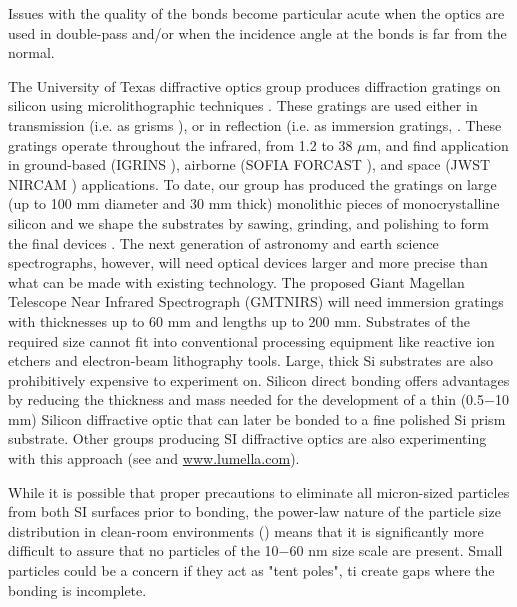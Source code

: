 \documentclass[osajnl,preprint,showpacs,superscriptaddress,12pt]{revtex4-1} %
\begin{document}
Issues with the quality of the bonds become particular acute when the optics are used in double-pass and/or when the incidence angle at the bonds is far from the normal.


The University of Texas diffractive optics group produces diffraction gratings on silicon using microlithographic techniques \cite{1998SPIE.3354..201J,2010SPIE.7739E.146W}.  These gratings are used either in transmission (i.e. as grisms \cite{2008SPIE.7014E..77D,2010SPIE.7739E.123G}), or in reflection (i.e. as immersion gratings, \cite{2007ApOpt..46.3400M,2010SPIE.7739E.146W,2012SPIE.8450E..2SG}.  These gratings operate throughout the infrared, from 1.2 to 38 $\mu$m, and find application in ground-based (IGRINS \cite{2010SPIE.7735E..54Y,2012SPIE.8450E..2SG}), airborne (SOFIA FORCAST \cite{2008SPIE.7014E..77D}), and space (JWST NIRCAM \cite{2005SPIE.5904...21B,2010SPIE.7739E.123G}) applications.  To date, our group has produced the gratings on large (up to 100 mm diameter and 30 mm thick) monolithic pieces of monocrystalline silicon and we shape the substrates by sawing, grinding, and polishing to form the final devices \cite{2010SPIE.7739E.146W}.  The next generation of astronomy and earth science spectrographs, however, will need optical devices larger and more precise than what can be made with existing technology.  The proposed Giant Magellan Telescope \cite{2012SPIE.8444E..1HJ} Near Infrared Spectrograph \cite{2006SPIE.6269E.143J,2010SPIE.7735E..87L} (GMTNIRS) will need immersion gratings with thicknesses up to 60 mm and lengths up to 200 mm.  Substrates of the required size cannot fit into conventional processing equipment like reactive ion etchers and electron-beam lithography tools.  Large, thick Si substrates are also prohibitively expensive to experiment on.  Silicon direct bonding \cite{1986JAP....60.2987S,2012SPIE.8450E..2TV} offers advantages by reducing the thickness and mass needed for the development of a thin (0.5$-$10 mm) Silicon diffractive optic that can later be bonded to a fine polished Si prism substrate.  Other groups producing SI diffractive optics are also experimenting with this approach (see \cite{2012SPIE.8450E..2TV} and \url{www.lumella.com}).


While it is possible that proper precautions to eliminate all micron-sized particles from both SI surfaces prior to bonding, the power-law nature of the particle size distribution in clean-room environments (\cite{Cooper_1986}) means that it is significantly more difficult to assure that no particles of the 10$-$60 nm size scale are present.  Small particles could be a concern if they act as "tent poles", ti create gaps where the bonding is incomplete.
\end{document}
